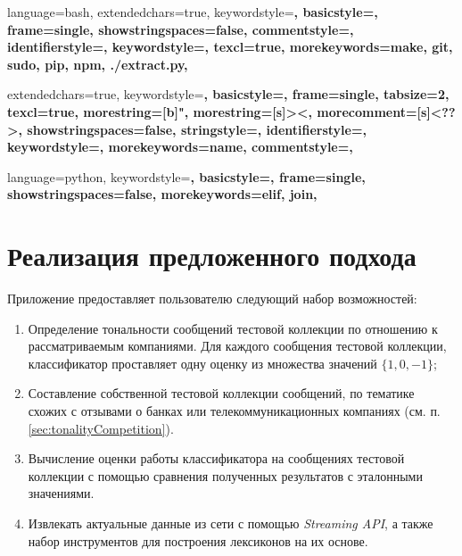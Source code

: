 
{
    language=bash,
    extendedchars=true,
    keywordstyle=\bfseries,
    basicstyle=\footnotesize,
    frame=single,
    showstringspaces=false,
    commentstyle=\color{red},
    identifierstyle=\color{black},
    keywordstyle=\color{blue},
    texcl=true,
    morekeywords={make, git, sudo, pip, npm, ./extract.py},
}

{
    extendedchars=true,
    keywordstyle=\bfseries,
    basicstyle=\footnotesize,
    frame=single,
    tabsize=2,
    texcl=true,
    morestring=[b]",
    morestring=[s]{>}{<},
    morecomment=[s]{<?}{?>},
    showstringspaces=false,
    stringstyle=\color{black},
    identifierstyle=\color{darkblue},
    keywordstyle=\color{cyan},
    morekeywords={name},
    commentstyle=\color{gray},
}

{
    language=python,
    keywordstyle=\bfseries,
    basicstyle=\footnotesize,
    frame=single,
    showstringspaces=false,
    morekeywords={elif, join},
}
\newcommand\xml{{\it XML }}

\newpage
\section{Реализация предложенного подхода}
    Приложение предоставляет пользователю следующий набор возможностей:
    \begin{enumerate}
        \item Определение тональности сообщений тестовой коллекции по отношению к
        рассматриваемым компаниями. Для каждого сообщения тестовой коллекции,
        классификатор проставляет одну оценку из множества значений $\{1, 0, -1\}$;
        \item Составление собственной тестовой коллекции сообщений, по тематике
        схожих с отзывами о банках или телекоммуникационных компаниях
        (см. п. \ref{sec:tonalityCompetition}).
        \item Вычисление оценки работы классификатора на сообщениях тестовой
        коллекции с помощью сравнения полученных результатов с эталонными значениями.
        \item Извлекать актуальные данные из сети \twitter с помощью
        {\it Streaming API}, а также набор инструментов для построения лексиконов
        на их основе.
    \end{enumerate}

    

    

    

    
